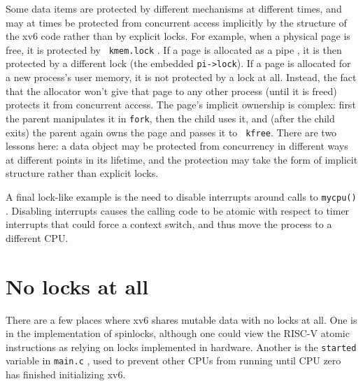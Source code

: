Some data items are protected by different mechanisms at different
times, and may at times be protected from concurrent access implicitly
by the structure of the xv6 code rather than by explicit locks. For
example, when a physical page is free, it is protected by {\tt
  kmem.lock} . If a page is
allocated as a pipe , it is then
protected by a different lock (the embedded {\tt pi->lock}). If a page
is allocated for a new process's user memory, it is not protected by a
lock at all. Instead, the fact that the allocator won't give that page
to any other process (until it is freed) protects it from concurrent
access. The page's implicit ownership is complex: first the parent
manipulates it in {\tt fork}, then the child uses it, and (after the
child exits) the parent again owns the page and passes it to {\tt
  kfree}. There are two lessons here: a data object may be protected
from concurrency in different ways at different points in its
lifetime, and the protection may take the form of implicit structure
rather than explicit locks.

A final lock-like example is the need to disable interrupts around
calls to {\tt mycpu()} . Disabling
interrupts causes the calling code to be atomic with respect to timer
interrupts that could force a context switch, and thus move the
process to a different CPU.

\section{No locks at all}

There are a few places where xv6 shares mutable data with no locks at
all. One is in the implementation of spinlocks, although one could
view the RISC-V atomic instructions as relying on locks implemented in
hardware. Another is the {\tt started} variable in {\tt main.c}
, used to prevent other CPUs from
running until CPU zero has finished initializing xv6.


% 
% 
% 
